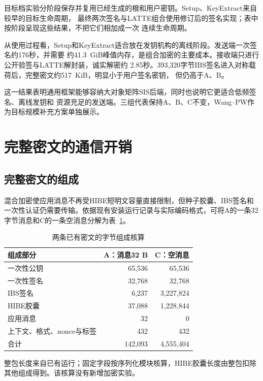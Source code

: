 目标档实验分阶段保存并复用已经生成的根和用户密钥。Setup、KeyExtract来自较早的目标生命周期，
最终两次签名与LATTE组合使用修订后的签名实现；表中按阶段呈现这些结果，不把它们相加成一次
连续生命周期。

从使用过程看，Setup和KeyExtract适合放在发钥机构的离线阶段。发送端一次签名约176秒，并需要
约41.3~GiB峰值内存，是组合加密的主要成本。接收端只进行公开验签与LATTE解封装，诚实解密约
2.85秒。393,320字节IBS签名进入对称载荷后，完整密文约517~KiB，明显小于用户签名密钥，
但仍高于A、B。

这一结果表明通用框架能够容纳大对象矩阵SIS后端，同时也说明它更适合低频签名、离线发钥和
资源充足的发送端。三组代表保持A、B、C不变，Wang--PW作为目标规模补充方案单独展示。

\section{完整密文的通信开销}
\subsection{完整密文的组成}
混合加密使应用消息不再受HIBE短明文容量直接限制，但种子胶囊、IBS签名和一次性认证仍需要传输。依据现有安装运行记录与实际编码格式，可将A的一条32字节消息和C的一条空消息分解为表~\ref{tab:ciphertext-parts}。

\begin{table}[H]
\centering\small
\caption{两条已有密文的字节组成核算}
\label{tab:ciphertext-parts}
\begin{tabular}{@{}lrr@{}}
\toprule
\rowcolor{black!8} 组成部分 & A：消息32 B & C：空消息 \\
\midrule
一次性公钥 & 65,536 & 65,536 \\
一次性签名 & 32,768 & 32,768 \\
IBS签名 & 6,237 & 3,227,824 \\
HIBE胶囊 & 37,088 & 1,228,844 \\
应用消息 & 32 & 0 \\
上下文、格式、nonce与标签 & 432 & 432 \\
\midrule
合计 & 142,093 & 4,555,404 \\
\bottomrule
\end{tabular}
\begin{minipage}{.96\textwidth}\footnotesize
整包长度来自已有运行；固定字段按序列化模块核算，HIBE胶囊长度由整包扣除其他组成得到。该核算没有新增加密实验。
\end{minipage}
\end{table}

